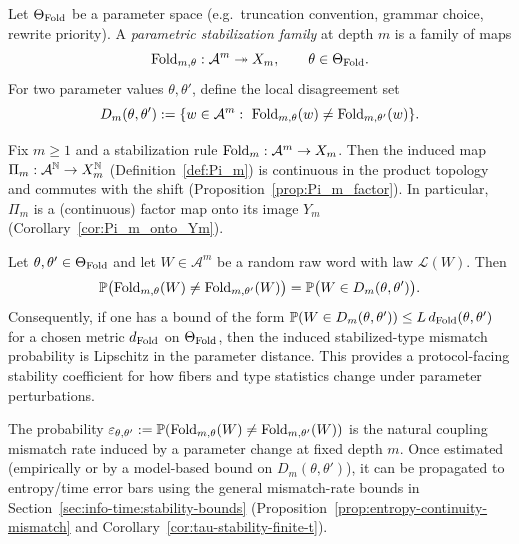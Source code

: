 \begin{definition}\label{def:fold-parametric}
Let $\Theta_{\mathrm{Fold}}$ be a parameter space (e.g.\ truncation convention, grammar choice, rewrite priority). A \emph{parametric stabilization family} at depth $m$ is a family of maps
\[
\mathrm{Fold}_{m,\theta}:\mathcal{A}^m\twoheadrightarrow X_m,\qquad \theta\in\Theta_{\mathrm{Fold}}.
\]
For two parameter values $\theta,\theta'$, define the local disagreement set
\[
D_m(\theta,\theta'):=\{w\in\mathcal{A}^m:\ \Fold_{m,\theta}(w)\neq \Fold_{m,\theta'}(w)\}.
\]
\end{definition}

\begin{proposition}\label{prop:Pi-continuous}
Fix $m\ge 1$ and a stabilization rule $\mathrm{Fold}_m:\mathcal{A}^m\to X_m$. Then the induced map $\Pi_m:\mathcal{A}^{\mathbb{N}}\to X_m^{\mathbb{N}}$ (Definition~\ref{def:Pi_m}) is continuous in the product topology and commutes with the shift (Proposition~\ref{prop:Pi_m_factor}). In particular, $\Pi_m$ is a (continuous) factor map onto its image $Y_m$ (Corollary~\ref{cor:Pi_m_onto_Ym}).
\end{proposition}

\begin{proposition}\label{prop:fold-param-lipschitz}
Let $\theta,\theta'\in\Theta_{\mathrm{Fold}}$ and let $W\in\mathcal{A}^m$ be a random raw word with law $\mathcal{L}(W)$. Then
\[
\mathbb{P}\bigl(\mathrm{Fold}_{m,\theta}(W)\neq \mathrm{Fold}_{m,\theta'}(W)\bigr)=\mathbb{P}\bigl(W\in D_m(\theta,\theta')\bigr).
\]
Consequently, if one has a bound of the form $\mathbb{P}(W\in D_m(\theta,\theta'))\le L\,d_{\mathrm{Fold}}(\theta,\theta')$ for a chosen metric $d_{\mathrm{Fold}}$ on $\Theta_{\mathrm{Fold}}$, then the induced stabilized-type mismatch probability is Lipschitz in the parameter distance. This provides a protocol-facing stability coefficient for how fibers and type statistics change under parameter perturbations.
\end{proposition}

\begin{remark}\label{rem:fold-param-to-time}
The probability $\varepsilon_{\theta,\theta'}:=\mathbb{P}(\mathrm{Fold}_{m,\theta}(W)\neq \mathrm{Fold}_{m,\theta'}(W))$ is the natural coupling mismatch rate induced by a parameter change at fixed depth $m$. Once estimated (empirically or by a model-based bound on $D_m(\theta,\theta')$), it can be propagated to entropy/time error bars using the general mismatch-rate bounds in Section~\ref{sec:info-time:stability-bounds} (Proposition~\ref{prop:entropy-continuity-mismatch} and Corollary~\ref{cor:tau-stability-finite-t}).
\end{remark}

